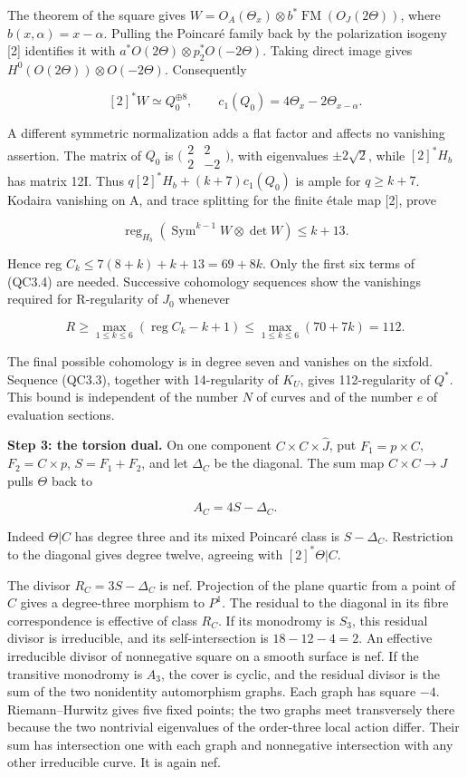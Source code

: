 The theorem of the square gives
\(W=O_A(\Theta _x)\otimes b^*\operatorname{FM}(O_J(2\Theta ))\), where
\(b(x,\alpha )=x-\alpha\). Pulling the Poincaré family back by the
polarization isogeny {[}2{]} identifies it with
\(a^*O(2\Theta )\otimes p_{2}^*O(-2\Theta )\). Taking direct image gives
\(H^{0}(O(2\Theta ))\otimes O(-2\Theta )\). Consequently

\[
 [2]^*W\simeq Q_0^{\oplus8},\qquad
 c_1(Q_0)=4\Theta_x-2\Theta_{x-\alpha}.
 \tag{QC3.5}
\]

A different symmetric normalization adds a flat factor and affects no
vanishing assertion. The matrix of \(Q_{0}\) is
\(\bigl(\begin{smallmatrix}2&2\\2&-2\end{smallmatrix}\bigr)\), with
eigenvalues \(\pm 2\sqrt 2\), while \([2]^*H_b\) has matrix 12I. Thus
\(q[2]^*H_b+(k+7)c_{1}(Q_{0})\) is ample for \(q\ge k+7\). Kodaira
vanishing on A, and trace splitting for the finite étale map {[}2{]},
prove

\[
 \operatorname{reg}_{H_b}(\operatorname{Sym}^{k-1}W\otimes\det W)
 \le k+13.
\]

Hence reg \(C_k\le 7(8+k)+k+13=69+8k\). Only the first six terms of
(QC3.4) are needed. Successive cohomology sequences show the vanishings
required for R-regularity of \(J_{0}\) whenever

\[
 R\ge\max_{1\le k\le6}(\operatorname{reg} C_k-k+1)
 \le\max_{1\le k\le6}(70+7k)=112.
\]

The final possible cohomology is in degree seven and vanishes on the
sixfold. Sequence (QC3.3), together with 14-regularity of \(K_U\), gives
112-regularity of \(Q^*\). This bound is independent of the number \(N\)
of curves and of the number \(e\) of evaluation sections.

\textbf{Step 3: the torsion dual.} On one component
\(C\times C\times \widehat{J}\), put \(F_{1}={p}\times C\),
\(F_{2}=C\times {p}\), \(S=F_{1}+F_{2}\), and let \(\Delta _C\) be the
diagonal. The sum map \(C\times C\to J\) pulls \(\Theta\) back to

\[
 A_C=4S-\Delta_C.
\]

Indeed \(\Theta |C\) has degree three and its mixed Poincaré class is
\(S-\Delta _C\). Restriction to the diagonal gives degree twelve,
agreeing with \([2]^*\Theta |C\).

The divisor \(R_C=3S-\Delta _C\) is nef. Projection of the plane quartic
from a point of \(C\) gives a degree-three morphism to \(P^{1}\). The
residual to the diagonal in its fibre correspondence is effective of
class \(R_C\). If its monodromy is \(S_{3}\), this residual divisor is
irreducible, and its self-intersection is \(18-12-4=2\). An effective
irreducible divisor of nonnegative square on a smooth surface is nef. If
the transitive monodromy is \(A_{3}\), the cover is cyclic, and the
residual divisor is the sum of the two nonidentity automorphism graphs.
Each graph has square \(-4\). Riemann--Hurwitz gives five fixed points;
the two graphs meet transversely there because the two nontrivial
eigenvalues of the order-three local action differ. Their sum has
intersection one with each graph and nonnegative intersection with any
other irreducible curve. It is again nef.

